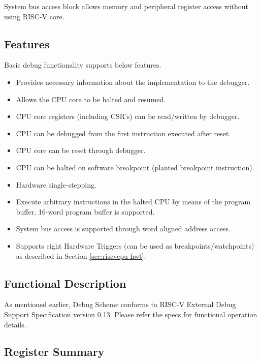 \documentclass[main\_\_EN.tex]{subfiles}
\begin{document}
System bus access block allows memory and peripheral register access without using RISC-V core.


\subsection{Features}
\label{sec:riscvcpu-dbg-features}
Basic debug functionality supports below features.

\begin{itemize}
    \item {Provides necessary information about the implementation to the debugger.}
    \item {Allows the CPU core to be halted and resumed.}
    \item {CPU core registers (including CSR's) can be read/written by debugger.}
    \item {CPU can be debugged from the first instruction executed after reset.}
    \item {CPU core can be reset through debugger.}
    \item {CPU can be halted on software breakpoint (planted breakpoint instruction).}
    \item {Hardware single-stepping.}
    \item {Execute arbitrary instructions in the halted CPU by means of the program buffer. 16-word program buffer is supported.}
    \item {System bus access is supported through word aligned address access.}
    \item {Supports eight Hardware Triggers (can be used as breakpoints/watchpoints) as described in Section \ref{sec:riscvcpu-hwt}.}
\end{itemize}

\subsection{Functional Description}
\label{sec:riscvcpu-dbg-func-descr}

As mentioned earlier, Debug Scheme conforms to RISC-V External Debug Support Specification version 0.13. Please refer the specs for functional operation details.


\hypertarget{riscvcpu-dbg-reg-summ}{}
\subsection{Register Summary}
\label{sec:riscvcpu-dbg-reg-summ}
\end{document}
